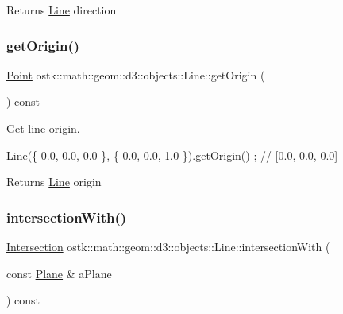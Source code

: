\begin{DoxyReturn}{Returns}
\hyperlink{classostk_1_1math_1_1geom_1_1d3_1_1objects_1_1_line}{Line} direction 
\end{DoxyReturn}
\mbox{\label{classostk_1_1math_1_1geom_1_1d3_1_1objects_1_1_line_afc9e2dbb4641c031b91c4b8019a41b69}} 
\subsubsection{\texorpdfstring{get\+Origin()}{getOrigin()}}
{\footnotesize\ttfamily \hyperlink{classostk_1_1math_1_1geom_1_1d3_1_1objects_1_1_point}{Point} ostk\+::math\+::geom\+::d3\+::objects\+::\+Line\+::get\+Origin (\begin{DoxyParamCaption}{ }\end{DoxyParamCaption}) const}



Get line origin. 


\begin{DoxyCode}
\hyperlink{classostk_1_1math_1_1geom_1_1d3_1_1objects_1_1_line_a9ebdaaf67a4bd91780808f8683463ebe}{Line}(\{ 0.0, 0.0, 0.0 \}, \{ 0.0, 0.0, 1.0 \}).\hyperlink{classostk_1_1math_1_1geom_1_1d3_1_1objects_1_1_line_afc9e2dbb4641c031b91c4b8019a41b69}{getOrigin}() ; \textcolor{comment}{// [0.0, 0.0, 0.0]}
\end{DoxyCode}


\begin{DoxyReturn}{Returns}
\hyperlink{classostk_1_1math_1_1geom_1_1d3_1_1objects_1_1_line}{Line} origin 
\end{DoxyReturn}
\mbox{\label{classostk_1_1math_1_1geom_1_1d3_1_1objects_1_1_line_a3dba3152c9257eb58f2437c687e410db}} 
\subsubsection{\texorpdfstring{intersection\+With()}{intersectionWith()}}
{\footnotesize\ttfamily \hyperlink{classostk_1_1math_1_1geom_1_1d3_1_1_intersection}{Intersection} ostk\+::math\+::geom\+::d3\+::objects\+::\+Line\+::intersection\+With (\begin{DoxyParamCaption}\item[{const \hyperlink{classostk_1_1math_1_1geom_1_1d3_1_1objects_1_1_plane}{Plane} \&}]{a\+Plane }\end{DoxyParamCaption}) const}



